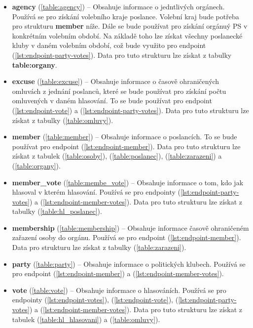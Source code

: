 \begin{itemize}
	\item \textbf{agency} (\ref{table:agency}) -- Obsahuje informace o jedntlivých orgánech. Používá se pro získání volebního kraje poslance. Volební kraj bude potřeba pro strukturu \textbf{member} níže. Dále se bude používat pro získání orgánuý PS v konkrétním volebním období. Na základě toho lze získat všechny poslanecké kluby v daném volebním období, což bude využito pro endpoint (\ref{lst:endpoint-party-votes}). Data pro tuto strukturu lze získat z tabulky \textbf{table:organy}.
	

	\item \textbf{excuse} (\ref{table:excuse}) -- Obsahuje informace o časově ohraničených omluvách z jednání poslanců, které se bude používat pro získání počtu omluvených v daném hlasování. To se bude používat pro endpoint (\ref{lst:endpoint-vote}) a (\ref{lst:endpoint-party-votes}). Data pro tuto strukturu lze získat z tabulky (\ref{table:omluvy}).
	
	\item \textbf{member} (\ref{table:member}) -- Obsahuje informace o poslancích. To se bude používat pro endpoint (\ref{lst:endpoint-member}). Data pro tuto strukturu lze získat z tabulek (\ref{table:osoby}), (\ref{table:poslanec}), (\ref{table:zarazeni}) a (\ref{table:organy}).
	
	\item \textbf{member\_vote} (\ref{table:membe_vote}) -- Obsahuje informace o tom, kdo jak hlasoval v kterém hlasování. Používá  se pro endpointy (\ref{lst:endpoint-party-votes}) a (\ref{lst:endpoint-member-votes}). Data pro tuto strukturu lze získat z tabulky (\ref{table:hl_poslanec}).
	
	\item \textbf{membership} (\ref{table:membership}) -- Obsahuje informace časově ohraničeném zařazení osoby do orgánu. Používá se pro endpoint (\ref{lst:endpoint-member}). Data pro strukturu lze získat z tabulky (\ref{table:zarazeni}).
	
	\item \textbf{party} (\ref{table:party}) -- Obsahuje informace o politických klubech. Používá se pro endpoint (\ref{lst:endpoint-member}) \linebreak a (\ref{lst:endpoint-member-votes}).
	
	\item \textbf{vote} (\ref{table:vote}) -- Obsahuje informace o hlasováních. Používá se pro endpointy (\ref{lst:endpoint-votes}), (\ref{lst:endpoint-vote}), (\ref{lst:endpoint-party-votes}) a (\ref{lst:endpoint-member-votes}). Data pro tuto strukturu lze získat z tabulek (\ref{table:hl_hlasovani}) a (\ref{table:omluvy}).

\end{itemize}
